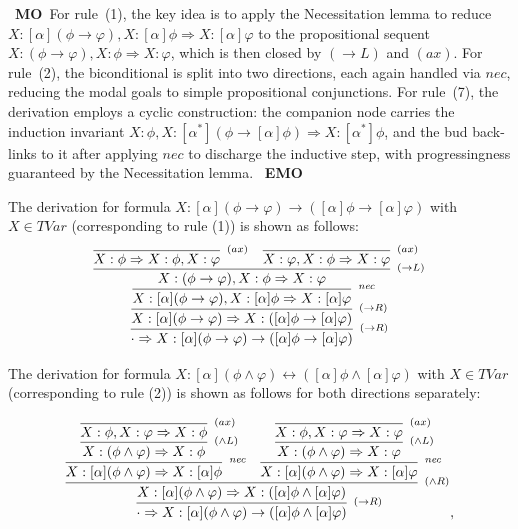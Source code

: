 \documentclass[manuscript,screen]{acmart}
\newcommand{\TVar}[0]{\textit{TVar}}
\newcommand{\Nec}[0]{\textit{nec}}
\newcommand{\A}[1]{\mbox{ \textbf{#1} }}
\newcommand{\MO}{\A{MO}}
\newcommand{\EMO}{\A{EMO}}
\begin{document}
\ifx
\MO For rule~(1), the key idea is to apply the Necessitation lemma to reduce $X:[\alpha](\phi\to\varphi), X:[\alpha]\phi\Rightarrow X:[\alpha]\varphi$ to the propositional sequent $X:(\phi\to\varphi), X:\phi\Rightarrow X:\varphi$, which is then closed by $(\to L)$ and $(ax)$.  For rule~(2), the biconditional is split into two directions, each again handled via $\Nec$, reducing the modal goals to simple propositional conjunctions.  For rule~(7), the derivation employs a cyclic construction: the companion node carries the induction invariant $X:\phi, X:[\alpha^*](\phi\to[\alpha]\phi)\Rightarrow X:[\alpha^*]\phi$, and the bud back-links to it after applying $\Nec$ to discharge the inductive step, with progressingness guaranteed by the Necessitation lemma. \EMO
\fi

The derivation for formula $X : [\alpha](\phi\to \varphi)\to ([\alpha]\phi\to [\alpha]\varphi)$  with $X\in \TVar$ (corresponding to rule (1)) is shown as follows:
$$
\infer[^{(\to R)}]
{\cdot \Rightarrow X : [\alpha](\phi\to \varphi)\to ([\alpha]\phi\to [\alpha]\varphi)}
{
    \infer[^{(\to R)}]
    {X : [\alpha](\phi\to \varphi)\Rightarrow X : ([\alpha]\phi\to [\alpha]\varphi)}
    {
        \infer[^{\Nec}]
        {X: [\alpha](\phi\to \varphi), X:[\alpha]\phi\Rightarrow X : [\alpha]\varphi}
        {
            \infer[^{(\to L)}]
            {X:(\phi\to\varphi), X : \phi\Rightarrow X : \varphi}
            {
                \infer[^{(ax)}]
                {X:\phi\Rightarrow X:\phi, X:\varphi}
                {}
                &
                \infer[^{(ax)}]
                {X:\varphi, X:\phi\Rightarrow X:\varphi}
                {}
            }
        }
    }
}
$$

The derivation for formula $X : [\alpha](\phi\wedge \varphi) \leftrightarrow ([\alpha]\phi \wedge [\alpha]\varphi)$ with $X\in \TVar$ (corresponding to rule (2)) is shown as follows for both directions separately:

$$
\infer[^{(\to R)}]
{\cdot \Rightarrow X : [\alpha](\phi\wedge \varphi) \to ([\alpha]\phi \wedge [\alpha]\varphi)}
{
    \infer[^{(\wedge R)}]
    {X:[\alpha](\phi\wedge \varphi)\Rightarrow X : ([\alpha]\phi \wedge [\alpha]\varphi)}
    {
        \infer[^{\Nec}]
        {X:[\alpha](\phi\wedge \varphi)\Rightarrow X : [\alpha]\phi}
        {
            \infer[^{(\wedge L)}]
            {X:(\phi\wedge \varphi)\Rightarrow X : \phi}
            {
                \infer[^{(ax)}]
                {X:\phi, X:\varphi\Rightarrow X:\phi}
                {}
            }
        }
        &
        \infer[^{\Nec}]
        {X:[\alpha](\phi\wedge \varphi)\Rightarrow X : [\alpha]\varphi}
        {
            \infer[^{(\wedge L)}]
            {X:(\phi\wedge \varphi)\Rightarrow X : \varphi}
            {
                \infer[^{(ax)}]
                {X:\phi, X:\varphi\Rightarrow X:\varphi}
                {}
            }
        }
    }
}, 
$$
\end{document}
